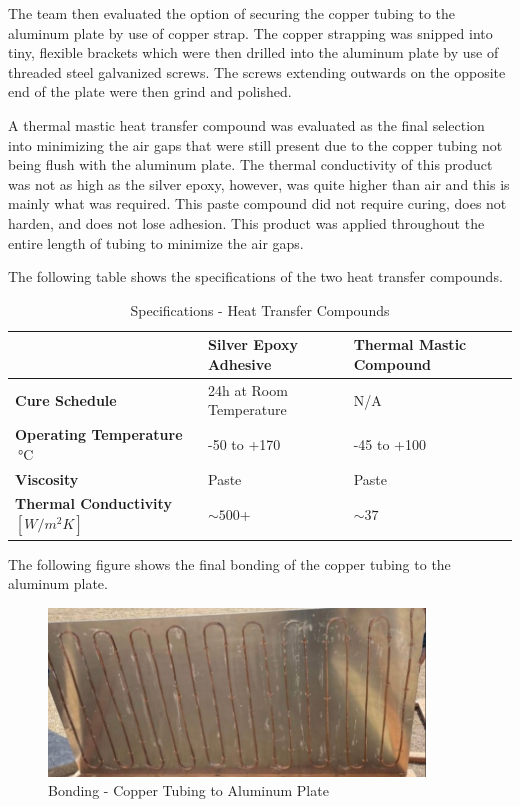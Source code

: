 \medskip
The team then evaluated the option of securing the copper tubing to the aluminum plate by use of copper strap. The copper strapping was snipped into tiny, flexible brackets which were then drilled into the aluminum plate by use of threaded steel galvanized screws. The screws extending outwards on the opposite end of the plate were then grind and polished.

\medskip
A thermal mastic heat transfer compound was evaluated as the final selection into minimizing the air gaps that were still present due to the copper tubing not being flush with the aluminum plate. The thermal conductivity of this product was not as high as the silver epoxy, however, was quite higher than air and this is mainly what was required. This paste compound did not require curing, does not harden, and does not lose adhesion. This product was applied throughout the entire length of tubing to minimize the air gaps.

\medskip
The following table shows the specifications of the two heat transfer compounds.

\medskip
\begin{table}[H]
\centering
\caption{Specifications - Heat Transfer Compounds}
\begin{tabular}{|P{60mm}|P{45mm}|P{45mm}|}
    \hline
     & Silver Epoxy Adhesive & Thermal Mastic Compound \\
    \hline
    \textbf{Cure Schedule} & 24h at Room Temperature & N/A \\
    \textbf{Operating Temperature $\SI{}{\celsius}$} & -50 to +170 & -45 to +100 \\
    \textbf{Viscosity} & Paste & Paste \\
    \textbf{Thermal Conductivity $[W/m^2 K]$} & $\sim500$+ & $\sim37$ \\
    \hline
\end{tabular}
\end{table}

\medskip
The following figure shows the final bonding of the copper tubing to the aluminum plate.

\medskip
\begin{figure}[H]
    \centering
    \includegraphics[width=10cm]{images/manifold.png}
    \caption{Bonding - Copper Tubing to Aluminum Plate}
\end{figure}


